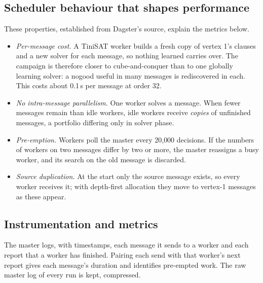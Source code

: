 \documentclass[11pt,a4paper,oneside]{report}
\theoremstyle{definition}
\begin{document}
\subsection{Scheduler behaviour that shapes performance}

These properties, established from Dagster's source, explain the metrics below.
\begin{itemize}
\item \emph{Per-message cost.} A TiniSAT worker builds a fresh copy of vertex 1's clauses and a
new solver for each message, so nothing learned carries over. The campaign is therefore closer to cube-and-conquer than to one
globally learning solver: a nogood useful in many messages is rediscovered in each. This costs about 0.1\,s per
message at order 32.
\item \emph{No intra-message parallelism.} One worker solves a message. When fewer messages
remain than idle workers, idle workers receive \emph{copies} of unfinished messages, a
portfolio differing only in solver phase.
\item \emph{Pre-emption.} Workers poll the master every 20{,}000 decisions. If the numbers of
workers on two messages differ by two or more, the master reassigns a busy worker, and its
search on the old message is discarded.
\item \emph{Source duplication.} At the start only the source message exists, so every worker
receives it; with depth-first allocation they move to vertex-1 messages as these appear.
\end{itemize}

\subsection{Instrumentation and metrics}

The master logs, with timestamps, each message it sends to a worker and each report that a
worker has finished. Pairing each send with that worker's next report gives each message's
duration and identifies pre-empted work. The raw master log of every run is kept, compressed.
\end{document}
